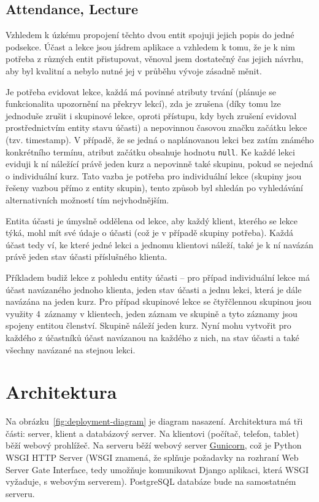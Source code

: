         \subsection{Attendance, Lecture}
        Vzhledem k úzkému propojení těchto dvou entit spojuji jejich popis do jedné podsekce. Účast a lekce jsou jádrem aplikace a vzhledem k tomu, že je k nim potřeba z různých entit přistupovat, věnoval jsem dostatečný čas jejich návrhu, aby byl kvalitní a nebylo nutné jej v průběhu vývoje zásadně měnit.
        
        Je potřeba evidovat lekce, každá má povinné atributy trvání (plánuje se funkcionalita upozornění na překryv lekcí), zda je zrušena (díky tomu lze jednoduše zrušit i skupinové lekce, oproti přístupu, kdy bych zrušení evidoval prostřednictvím entity stavu účasti) a nepovinnou časovou značku začátku lekce (tzv. timestamp). V případě, že se jedná o naplánovanou lekci bez zatím známého konkrétního termínu, atribut začátku obsahuje hodnotu \verb|null|. Ke každé lekci eviduji k ní náležící právě jeden kurz a nepovinně také skupinu, pokud se nejedná o individuální kurz. Tato vazba je potřeba pro individuální lekce (skupiny jsou řešeny vazbou přímo z entity skupin), tento způsob byl shledán po vyhledávání alternativních možností tím nejvhodnějším.
        
        Entita účasti je úmyslně oddělena od lekce, aby každý klient, kterého se lekce týká, mohl mít své údaje o účasti (což je v případě skupiny potřeba). Každá účast tedy ví, ke které jedné lekci a jednomu klientovi náleží, také je k ní navázán právě jeden stav účasti příslušného klienta.
        
        Příkladem budiž lekce z pohledu entity účasti -- pro případ individuální lekce má účast navázaného jednoho klienta, jeden stav účasti a jednu lekci, která je dále navázána na jeden kurz. Pro případ skupinové lekce se čtyřčlennou skupinou jsou využity 4~záznamy v klientech, jeden záznam ve skupině a tyto záznamy jsou spojeny entitou členství. Skupině náleží jeden kurz. Nyní mohu vytvořit pro každého z účastníků účast navázanou na každého z nich, na stav účasti a také všechny navázané na stejnou lekci.
        

    \section{Architektura}\label{architektura}
    Na obrázku~\ref{fig:deployment-diagram} je diagram nasazení. Architektura má tři části: server, klient a databázový server. Na klientovi (počítač, telefon, tablet) běží webový prohlížeč. Na serveru běží webový server \href{http://gunicorn.org/}{Gunicorn}, což je Python WSGI HTTP Server (WSGI znamená, že splňuje požadavky na rozhraní Web Server Gate Interface, tedy umožňuje komunikovat Django aplikaci, která WSGI vyžaduje, s webovým serverem). PostgreSQL databáze bude na samostatném serveru.
    
